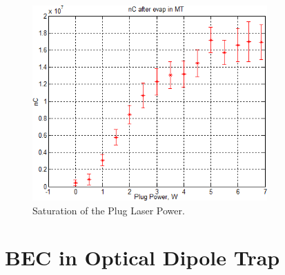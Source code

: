 \begin{figure}
  \begin{center}
    \includegraphics[width=9cm]{plug-power.png}
  \end{center}
  \caption{Saturation of the Plug Laser Power.}
  \label{exp:plug-power}
\end{figure}

\section{BEC in Optical Dipole Trap}\label{exp:odt}

